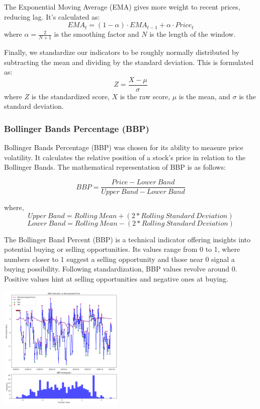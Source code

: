 \documentclass[
	letterpaper, %
]{jdf}
\begin{document}
The Exponential Moving Average (EMA) gives more weight to recent prices, reducing lag. It's calculated as:
{\small
\[
EMA_{t} = (1-\alpha) \cdot EMA_{t-1} + \alpha \cdot Price_{t}
\]
}
where $\alpha = \frac{2}{N+1}$ is the smoothing factor and $N$ is the length of the window.

Finally, we standardize our indicators to be roughly normally distributed by subtracting the mean and dividing by the standard deviation. This is formulated as:
{\small
\[
Z = \frac{X - \mu}{\sigma}
\]
}
where $Z$ is the standardized score, $X$ is the raw score, $\mu$ is the mean, and $\sigma$ is the standard deviation.

	
\subsubsection{Bollinger Bands Percentage (BBP)}

Bollinger Bands Percentage (BBP) was chosen for its ability to measure price volatility. It calculates the relative position of a stock's price in relation to the Bollinger Bands. The mathematical representation of BBP is as follows:

\[
BBP = \frac{Price - Lower\ Band}{Upper\ Band - Lower\ Band}
\]

where, 
\[
Upper\ Band = Rolling\ Mean + (2 * Rolling\ Standard\ Deviation)
\]
\[
Lower\ Band = Rolling\ Mean - (2 * Rolling\ Standard\ Deviation)
\]


The Bollinger Band Percent (BBP) is a technical indicator offering insights into potential buying or selling opportunities. Its values range from 0 to 1, where numbers closer to 1 suggest a selling opportunity and those near 0 signal a buying possibility. Following standardization, BBP values revolve around 0. Positive values hint at selling opportunities and negative ones at buying.

\begin{jdffigure}
\includegraphics[height=6cm]{Figures/BBP_hist_and_price.png}%
\label{fig:BBP}%
\end{jdffigure}
	
\end{document}
